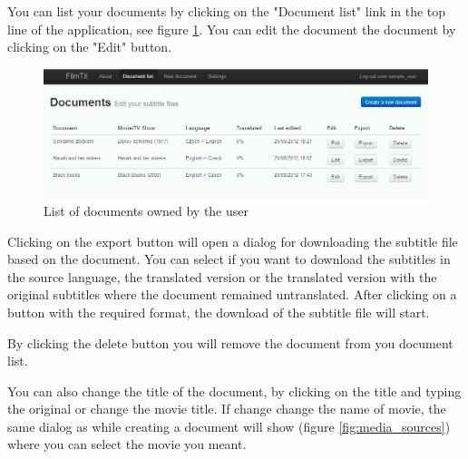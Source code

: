 You can list your documents by clicking on the "Document list" link in the top line of the application, see figure \ref{fig:document_list}. You can edit the document the document by clicking on the "Edit" button.

\begin{figure}[h]
\begin{center}
\includegraphics[scale=0.4]{figures/user_manual/list_of_documents.png}
\end{center}
\caption{List of documents owned by the user}
\label{fig:document_list}
\end{figure}

Clicking on the export button will open a dialog for downloading the subtitle file based on the document. You can select if you want to download the subtitles in the source language, the translated version or the translated version with the original subtitles where the document remained untranslated. After clicking on a button with the required format, the download of the subtitle file will start.

By clicking the delete button you will remove the document from you document list.

You can also change the title of the document, by clicking on the title and typing the original or change the movie title. If change change the name of movie, the same dialog as while creating a document will show (figure \ref{fig:media_sources}) where you can select the movie you meant.